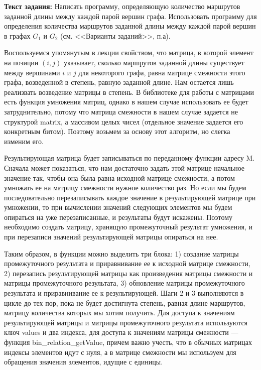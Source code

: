 \documentclass[12pt]{article}
\begin{document}
	{\bf Текст задания:} Написать программу, определяющую количество маршрутов заданной длины между каждой парой вершин графа. Использовать программу для определения количества маршрутов заданной длины между	каждой парой вершин в графах $G_1$ и $G_2$ (см. <<Варианты заданий>>, п.а).
	
	Воспользуемся упомянутым в лекции свойством, что матрица, в которой элемент на позиции $(i, j)$ указывает, сколько маршрутов заданной длины существует между вершинами $i$ и $j$ для некоторого графа, равна матрице смежности этого графа, возведенной в степень, равную заданной длине. Нам остается лишь реализвать возведение матрицы в степень. В библиотеке для работы с матрицами есть функция умножения матриц, однако в нашем случае использовать ее будет затруднительно, потому что матрица смежности в нашем случае задается не структурой matrix, а массивом целых чисел (отдельное значение задается его конкретным битом). Поэтому возьмем за основу этот алгоритм, но слегка изменим его.
	
	Результирующая матрица будет записываться по переданному функции адресу M. Сначала может показаться, что нам достаточно задать этой матрице начальное значение так, чтобы она была равна исходной матрице смежности, а потом умножать ее на матрицу смежности нужное количество раз. Но если мы будем последовательно перезаписывать каждое значение в результирующей матрице при умножении, то при вычислении значений следующих элементов мы будем опираться на уже перезаписанные, и результаты будут искажены. Поэтому необходимо создать матрицу, хранящую промежуточный результат умножения, и при перезаписи значений результирующей матрицы опираться на нее. 
	
	Таким образом, в функции можно выделить три блока: 1) создание матрицы промежуточного результата и приравнивание ее к исходной матрице смежности, 2) перезапись результирующей матрицы как произведения матрицы смежности и матрицы промежуточного результата, 3) обновление матрицы промежуточного результата и приравнивание ее к результирующей. Шаги 2 и 3 выполняются в цикле до тех пор, пока не будет достигнута степень, равная длине маршрутов, матрицу количества которых мы хотим получить. Для доступа к значениям результирующей матрицы и матрицы промежуточного результата используются ключ values и два индекса, для доступа к значениям матрицы смежности --- функция bin\_relation\_getValue, причем важно учесть, что в обычных матрицах индексы элементов идут с нуля, а в матрице смежности мы используем для обращения значения элементов, идущие с единицы.
	
\end{document}
